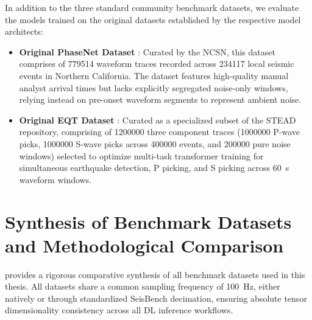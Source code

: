 In addition to the three standard community benchmark datasets, we evaluate the
models trained on the original datasets established by the respective model
architects:
\begin{itemize}
  \item \textbf{Original \acs{PhaseNet} Dataset} \parencite{PhaseNet}: Curated
    by the \ac{NCSN}, this dataset comprises of \num{779514} waveform traces
    recorded across \num{234117} local seismic events in Northern California.
    The dataset features high-quality manual analyst arrival times but lacks
    explicitly segregated noise-only windows, relying instead on pre-onset
    waveform segments to represent ambient noise.
  \item \textbf{Original \acs{EQT} Dataset}
    \parencite{EQTransformer}: Curated as a specialized subset of the
    \ac{STEAD} repository, comprising of \num{1200000} three component traces
    (\num{1000000} P-wave picks, \num{1000000} S-wave picks across \num{400000}
    events, and \num{200000} pure noise windows) selected to optimize
    multi-task transformer training for simultaneous earthquake detection, P
    picking, and S picking across \qty{60}{\second} waveform windows.
\end{itemize}

\section{Synthesis of Benchmark Datasets and Methodological Comparison}
\label{sec:dataset_synthesis}

 provides a rigorous comparative synthesis of all benchmark
datasets used in this thesis. All datasets share a common sampling frequency of
\qty{100}{\hertz}, either natively or through standardized SeisBench
decimation, ensuring absolute tensor dimensionality consistency across all
\ac{DL} inference workflows.

